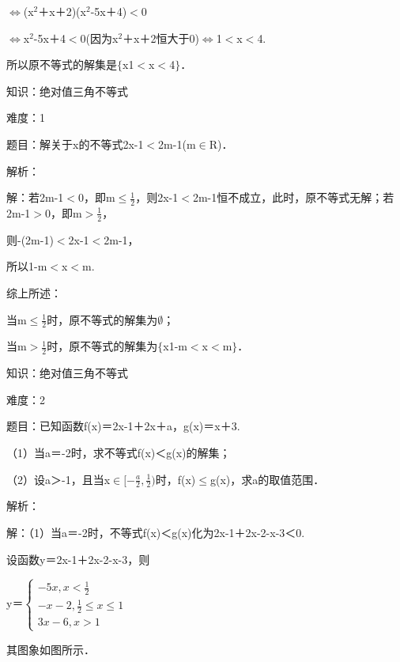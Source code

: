\documentclass{article} %
\begin{document}
$\mathrm{\Leftrightarrow }$(x${}^{2}$＋x＋2)(x${}^{2}$-5x＋4)$\mathrm{<}$0

$\mathrm{\Leftrightarrow }$x${}^{2}$-5x＋4$\mathrm{<}$0(因为x${}^{2}$＋x＋2恒大于0)$\mathrm{\Leftrightarrow }$1$\mathrm{<}$x$\mathrm{<}$4.

所以原不等式的解集是$\mathrm{\{}$x{\textbar}1$\mathrm{<}$x$\mathrm{<}$4$\mathrm{\}}$．



知识：绝对值三角不等式

难度：1

题目：解关于x的不等式{\textbar}2x-1{\textbar}$\mathrm{<}$2m-1(m$\mathrm{\in}$R)．

解析：

解：若2m-1$\mathrm{<}$0，即m$\mathrm{\le}\frac{1}{2}$，则{\textbar}2x-1{\textbar}$\mathrm{<}$2m-1恒不成立，此时，原不等式无解；若2m-1$\mathrm{>}$0，即m$\mathrm{>}\frac{1}{2}$，

则-(2m-1)$\mathrm{<}$2x-1$\mathrm{<}$2m-1，

所以1-m$\mathrm{<}$x$\mathrm{<}$m.

综上所述：

当m$\mathrm{\le}\frac{1}{2}$时，原不等式的解集为$\mathrm{\emptyset}$；

当m$\mathrm{>}\frac{1}{2}$时，原不等式的解集为$\mathrm{\{}$x{\textbar}1-m$\mathrm{<}$x$\mathrm{<}$m$\mathrm{\}}$．



知识：绝对值三角不等式

难度：2

题目：已知函数f(x)＝{\textbar}2x-1{\textbar}＋{\textbar}2x＋a{\textbar}，g(x)＝x＋3.

（1）当a＝-2时，求不等式f(x)＜g(x)的解集；

（2）设a＞-1，且当x$\mathrm{\in}[-\frac{a}{2},\frac{1}{2})$时，f(x)$\mathrm{\le}$g(x)，求a的取值范围．

解析：

解：（1）当a＝-2时，不等式f(x)＜g(x)化为{\textbar}2x-1{\textbar}＋{\textbar}2x-2{\textbar}-x-3＜0.

设函数y＝{\textbar}2x-1{\textbar}＋{\textbar}2x-2{\textbar}-x-3，则

y＝$\left\{\begin{array}{r}
-5x,x<\frac{1}{2}\\
-x-2,\frac{1}{2}\le x\le1\\
3x-6,x>1
\end{array} \right.$

其图象如图所示．
\end{document}
